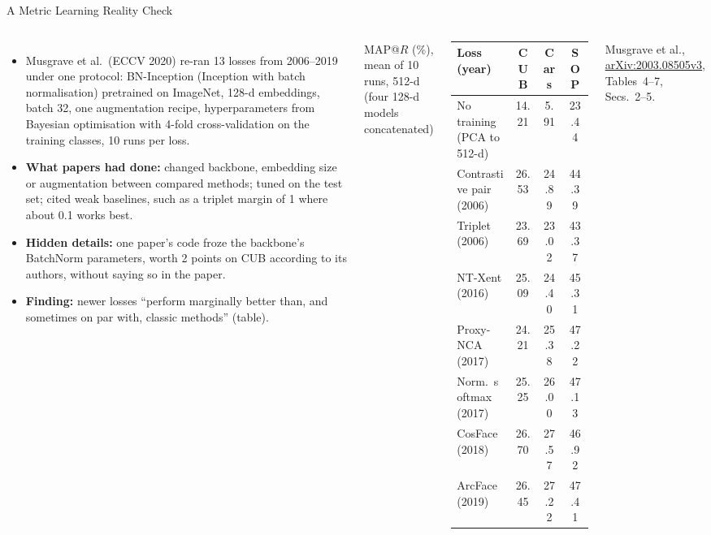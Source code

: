 \begin{frame}{A Metric Learning Reality Check}
  \begin{columns}[T,onlytextwidth]
      \begin{itemize}\footnotesize\itemsep0.4em
        \item Musgrave et al.\ (ECCV 2020) re-ran 13 losses from 2006--2019 under one protocol: BN-Inception (Inception with batch normalisation) pretrained on ImageNet, 128-d embeddings, batch 32, one augmentation recipe, hyperparameters from Bayesian optimisation with 4-fold cross-validation on the training classes, 10 runs per loss.
        \item \textbf{What papers had done:} changed backbone, embedding size or augmentation between compared methods; tuned on the test set; cited weak baselines, such as a triplet margin of 1 where about 0.1 works best.
        \item \textbf{Hidden details:} one paper's code froze the backbone's BatchNorm parameters, worth 2 points on CUB according to its authors, without saying so in the paper.
        \item \textbf{Finding:} newer losses ``perform marginally better than, and sometimes on par with, classic methods'' (table).
      \end{itemize}
      \centering
      \vspace{0.2em}
      {\scriptsize MAP@$R$ (\%), mean of 10 runs, 512-d (four 128-d models concatenated)\par}
      \vspace{0.3em}
      {\scriptsize\setlength{\tabcolsep}{4pt}
      \begin{tabular}{@{}l c c c@{}}
        \toprule
        \textbf{Loss (year)} & \textbf{CUB} & \textbf{Cars} & \textbf{SOP} \\
        \midrule
        No training (PCA to 512-d) & 14.21 & 5.91 & 23.44 \\
        Contrastive pair (2006) & 26.53 & 24.89 & 44.39 \\
        Triplet (2006) & 23.69 & 23.02 & 43.37 \\
        NT-Xent (2016) & 25.09 & 24.40 & 45.31 \\
        Proxy-NCA (2017) & 24.21 & 25.38 & 47.22 \\
        Norm.\ softmax (2017) & 25.25 & 26.00 & 47.13 \\
        CosFace (2018) & 26.70 & 27.57 & 46.92 \\
        ArcFace (2019) & 26.45 & 27.22 & 47.41 \\
        \bottomrule
      \end{tabular}\par}
      \vspace{0.4em}
      {\scriptsize Musgrave et al., \href{https://arxiv.org/abs/2003.08505v3}{arXiv:2003.08505v3}, Tables~4--7, Secs.~2--5.\par}
  \end{columns}
\end{frame}

